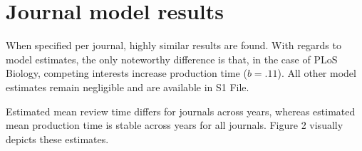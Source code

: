 \section*{Journal model results}
When specified per journal, highly similar results are found. With regards to model estimates, the only noteworthy difference is that, in the case of PLoS Biology, competing interests increase production time ($b=.11$). All other model estimates remain negligible and are available in S1 File.

Estimated mean review time differs for journals across years, whereas estimated mean production time is stable across years for all journals. Figure 2 visually depicts these estimates. 